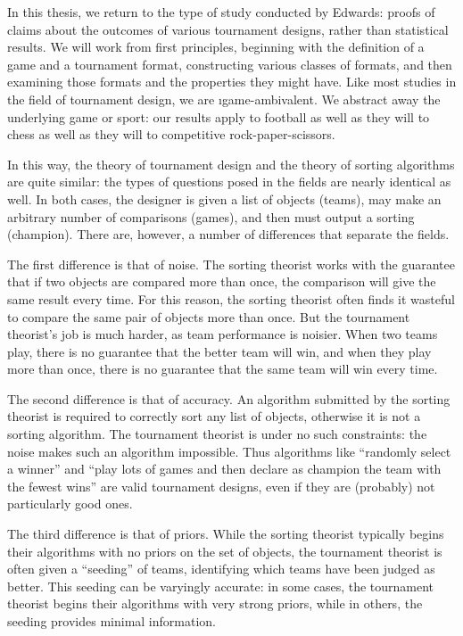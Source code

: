 {    In this thesis, we return to the type of study conducted by Edwards: proofs of claims about the outcomes of various tournament designs, rather than statistical results. We will work from first principles, beginning with the definition of a game and a tournament format, constructing various classes of formats, and then examining those formats and the properties they might have. Like most studies in the field of tournament design, we are \i{game-ambivalent}. We abstract away the underlying game or sport: our results apply to football as well as they will to chess as well as they will to competitive rock-paper-scissors.

    In this way, the theory of tournament design and the theory of sorting algorithms are quite similar: the types of questions posed in the fields are nearly identical as well. In both cases, the designer is given a list of objects (teams), may make an arbitrary number of comparisons (games), and then must output a sorting (champion). There are, however, a number of differences that separate the fields.

    \;

    The first difference is that of noise. The sorting theorist works with the guarantee that if two objects are compared more than once, the comparison will give the same result every time. For this reason, the sorting theorist often finds it wasteful to compare the same pair of objects more than once. But the tournament theorist's job is much harder, as team performance is noisier. When two teams play, there is no guarantee that the better team will win, and when they play more than once, there is no guarantee that the same team will win every time.

    The second difference is that of accuracy. An algorithm submitted by the sorting theorist is required to correctly sort any list of objects, otherwise it is not a sorting algorithm. The tournament theorist is under no such constraints: the noise makes such an algorithm impossible. Thus algorithms like ``randomly select a winner'' and ``play lots of games and then declare as champion the team with the fewest wins'' are valid tournament designs, even if they are (probably) not particularly good ones.

    The third difference is that of priors. While the sorting theorist typically begins their algorithms with no priors on the set of objects, the tournament theorist is often given a ``seeding'' of teams, identifying which teams have been judged as better. This seeding can be varyingly accurate: in some cases, the tournament theorist begins their algorithms with very strong priors, while in others, the seeding provides minimal information.

}
